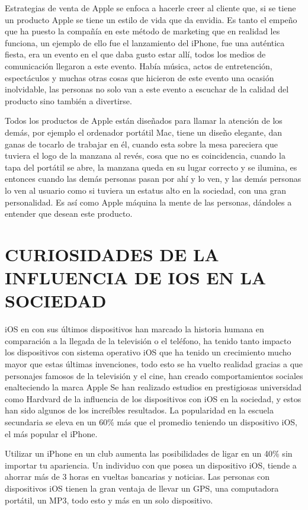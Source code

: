 Estrategias de venta de Apple se enfoca a hacerle creer al
cliente que, si se tiene un producto Apple se tiene un estilo de
vida que da envidia.
Es tanto el empeño que ha puesto la compañía en este método
de marketing que en realidad les funciona, un ejemplo de ello
fue el lanzamiento del iPhone, fue una auténtica fiesta, era un
evento en el que daba gusto estar allí, todos los medios de
comunicación llegaron a este evento. Había música, actos de
entretención, espectáculos y muchas otras cosas que hicieron de
este evento una ocasión inolvidable, las personas no solo van a
este evento a escuchar de la calidad del producto sino también a
divertirse.

Todos los productos de Apple están diseñados para llamar la
atención de los demás, por ejemplo el ordenador portátil Mac,
tiene un diseño elegante, dan ganas de tocarlo de trabajar en él,
cuando esta sobre la mesa pareciera que tuviera el logo de la
manzana al revés, cosa que no es coincidencia, cuando la tapa
del portátil se abre, la manzana queda en su lugar correcto y se
ilumina, es entonces cuando las demás personas pasan por ahí y
lo ven, y las demás personas lo ven al usuario como si tuviera un
estatus alto en la sociedad, con una gran personalidad. Es así
como Apple máquina la mente de las personas, dándoles a
entender que desean este producto.

\section*{CURIOSIDADES DE LA INFLUENCIA DE IOS EN LA SOCIEDAD}

iOS en con sus últimos dispositivos han marcado la historia
humana en comparación a la llegada de la televisión o el
teléfono, ha tenido tanto impacto los dispositivos con sistema
operativo iOS que ha tenido un crecimiento mucho mayor que
estas últimas invenciones, todo esto se ha vuelto realidad
gracias a que personajes famosos de la televisión y el cine, han
creado comportamientos sociales enalteciendo la marca Apple
Se han realizado estudios en prestigiosas universidad como
Hardvard de la influencia de los dispositivos con iOS en la
sociedad, y estos han sido algunos de los increíbles resultados.
La popularidad en la escuela secundaria se eleva en un 60\% más
que el promedio teniendo un dispositivo iOS, el más popular el
iPhone.

Utilizar un iPhone en un club aumenta las posibilidades de ligar
en un 40\% sin importar tu apariencia.
Un individuo con que posea un dispositivo iOS, tiende a ahorrar
más de 3 horas en vueltas bancarias y noticias.
Las personas con dispositivos iOS tienen la gran ventaja de
llevar un GPS, una computadora portátil, un MP3, todo esto y
más en un solo dispositivo.

